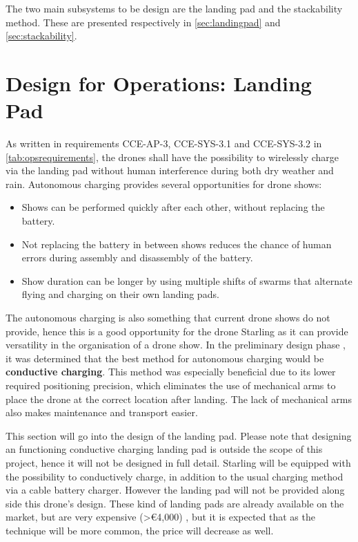 
The two main subsystems to be design are the landing pad and the stackability method. These are presented respectively in \autoref{sec:landingpad} and \autoref{sec:stackability}.

\section{Design for Operations: Landing Pad}\label{sec:landingpad}

As written in requirements CCE-AP-3, CCE-SYS-3.1 and CCE-SYS-3.2 in \autoref{tab:opsrequirements}, the drones shall have the possibility to wirelessly charge via the landing pad without human interference during both dry weather and rain. Autonomous charging provides several opportunities for drone shows:
\begin{itemize}[noitemsep,nolistsep]
    \item Shows can be performed quickly after each other, without replacing the battery.
    \item Not replacing the battery in between shows reduces the chance of human errors during assembly and disassembly of the battery.
    \item Show duration can be longer by using multiple shifts of swarms that alternate flying and charging on their own landing pads.
\end{itemize}

The autonomous charging is also something that current drone shows do not provide, hence this is a good opportunity for the drone Starling as it can provide versatility in the organisation of a drone show. 
In the preliminary design phase \cite{midterm}, it was determined that the best method for autonomous charging would be \textbf{conductive charging}. This method was especially beneficial due to its lower required positioning precision, which eliminates the use of mechanical arms to place the drone at the correct location after landing. The lack of mechanical arms also makes maintenance and transport easier. 

This section will go into the design of the landing pad. Please note that designing an functioning conductive charging landing pad is outside the scope of this project, hence it will not be designed in full detail. Starling will be equipped with the possibility to conductively charge, in addition to the usual charging method via a cable battery charger. However the landing pad will not be provided along side this drone's design. These kind of landing pads are already available on the market, but are very expensive (>€4,000) \cite{skycharge}, but it is expected that as the technique will be more common, the price will decrease as well. 

